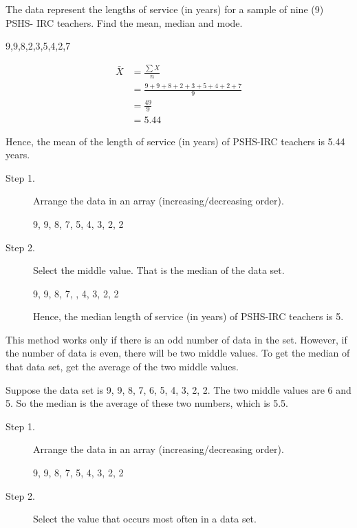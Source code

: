 \begin{example}
\Item The data represent the lengths of service (in years) for a sample of nine (9) PSHS-
IRC teachers. Find the mean, median and mode.
\begin{center}
9,9,8,2,3,5,4,2,7
\end{center}
\Solution

\begin{myenumerate}
\item {}
\begin{align*}
\bar{X}&=\frac{\sum X}{n}\\
 &=\frac{9+9+8+2+3+5+4+2+7}{9}\\
 &=\frac{49}{9}\\
 &=\boxed{5.44}
\end{align*}

Hence, the mean of the length of service (in years) of PSHS-IRC teachers is 5.44
years.

\item {}
\begin{description}
\item[Step 1.] Arrange the data in an array (increasing/decreasing order).
\begin{center}
9, 9, 8, 7, 5, 4, 3, 2, 2
\end{center}
\item[Step 2.] Select the middle value. That is the median of the data set.
\begin{center}
9, 9, 8, 7, \phantom{5}, 4, 3, 2, 2
\end{center}

Hence, the median length of service (in years) of PSHS-IRC teachers is 5.
\end{description}
This method works only if there is an odd number of data in the set. However,
if the number of data is even, there will be two middle values. To get the
median of that data set, get the average of the two middle values.

Suppose the data set is 9, 9, 8, 7, 6, 5, 4, 3, 2, 2. The two middle values are 6 and
5. So the median is the average of these two numbers, which is 5.5.

\item {}
\begin{description}
\item[Step 1.] Arrange the data in an array (increasing/decreasing order).
\begin{center}
9, 9, 8, 7, 5, 4, 3, 2, 2
\end{center}
\item[Step 2.] Select the value that occurs most often in a data set.


\end{description}
\end{myenumerate}
\end{example}
